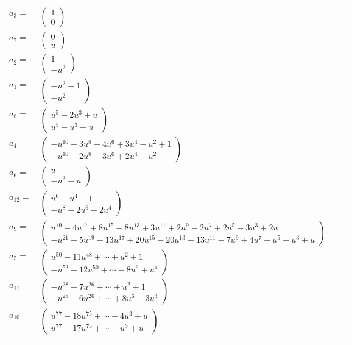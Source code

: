 \documentclass[1p]{elsarticle_modified}
\theoremstyle{definition}
\begin{document}
\begin{tabular}{m{7pt} m{180pt} m{7pt} m{180pt} }
\flushright $a_{3}=$&$\begin{pmatrix}1\\0\end{pmatrix}$ \\
\flushright $a_{7}=$&$\begin{pmatrix}0\\u\end{pmatrix}$ \\
\flushright $a_{2}=$&$\begin{pmatrix}1\\- u^2\end{pmatrix}$ \\
\flushright $a_{1}=$&$\begin{pmatrix}- u^2+1\\- u^2\end{pmatrix}$ \\
\flushright $a_{8}=$&$\begin{pmatrix}u^5-2 u^3+u\\u^5- u^3+u\end{pmatrix}$ \\
\flushright $a_{4}=$&$\begin{pmatrix}- u^{10}+3 u^8-4 u^6+3 u^4- u^2+1\\- u^{10}+2 u^8-3 u^6+2 u^4- u^2\end{pmatrix}$ \\
\flushright $a_{6}=$&$\begin{pmatrix}u\\- u^3+u\end{pmatrix}$ \\
\flushright $a_{12}=$&$\begin{pmatrix}u^6- u^4+1\\- u^8+2 u^6-2 u^4\end{pmatrix}$ \\
\flushright $a_{9}=$&$\begin{pmatrix}u^{19}-4 u^{17}+8 u^{15}-8 u^{13}+3 u^{11}+2 u^9-2 u^7+2 u^5-3 u^3+2 u\\- u^{21}+5 u^{19}-13 u^{17}+20 u^{15}-20 u^{13}+13 u^{11}-7 u^9+4 u^7- u^5- u^3+u\end{pmatrix}$ \\
\flushright $a_{5}=$&$\begin{pmatrix}u^{50}-11 u^{48}+\cdots+u^2+1\\- u^{52}+12 u^{50}+\cdots-8 u^6+u^4\end{pmatrix}$ \\
\flushright $a_{11}=$&$\begin{pmatrix}- u^{28}+7 u^{26}+\cdots+u^2+1\\- u^{28}+6 u^{26}+\cdots+8 u^6-3 u^4\end{pmatrix}$ \\
\flushright $a_{10}=$&$\begin{pmatrix}u^{77}-18 u^{75}+\cdots-4 u^3+u\\u^{77}-17 u^{75}+\cdots- u^3+u\end{pmatrix}$\\&\end{tabular}
\end{document}
